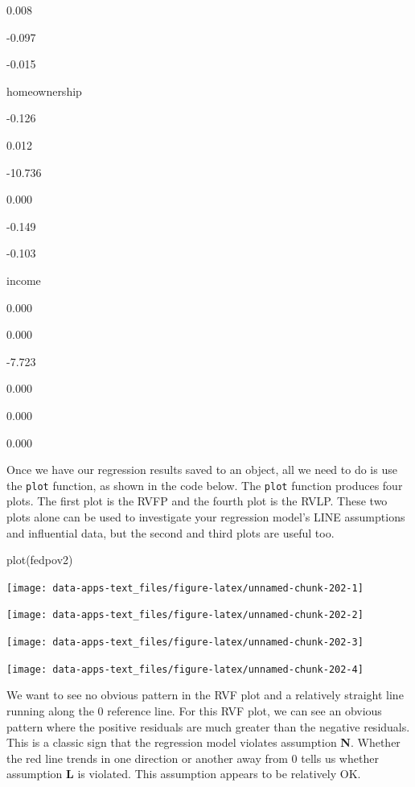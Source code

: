 \documentclass[
]{book}
\makeatletter
\newenvironment{Shaded}{\begin{snugshade}}{\end{snugshade}}
\newcommand{\FunctionTok}[1]{\textcolor[rgb]{0,0,0}{#1}}
\newcommand{\NormalTok}[1]{#1}
\newenvironment{kframe}{%
\medskip{}
\setlength{\fboxsep}{.8em}
 \def\at@end@of@kframe{}%
 \ifinner\ifhmode%
  \def\at@end@of@kframe{\end{minipage}}%
  \begin{minipage}{\columnwidth}%
 \fi\fi%
 \def\FrameCommand##1{\hskip\@totalleftmargin \hskip-\fboxsep
 \colorbox{shadecolor}{##1}\hskip-\fboxsep
     \hskip-\linewidth \hskip-\@totalleftmargin \hskip\columnwidth}%
 \MakeFramed {\advance\hsize-\width
   \@totalleftmargin\z@ \linewidth\hsize
   \@setminipage}}%
 {\par\unskip\endMakeFramed%
 \at@end@of@kframe}
\renewenvironment{Shaded}{\begin{kframe}}{\end{kframe}}
\makeatother
\begin{document}
0.008

-0.097

-0.015

homeownership

-0.126

0.012

-10.736

0.000

-0.149

-0.103

income

0.000

0.000

-7.723

0.000

0.000

0.000

Once we have our regression results saved to an object, all we need to do is use the \texttt{plot} function, as shown in the code below. The \texttt{plot} function produces four plots. The first plot is the RVFP and the fourth plot is the RVLP. These two plots alone can be used to investigate your regression model's LINE assumptions and influential data, but the second and third plots are useful too.

\begin{Shaded}
\begin{Highlighting}[]
\FunctionTok{plot}\NormalTok{(fedpov2)}
\end{Highlighting}
\end{Shaded}

\begin{center}\texttt{[image: data-apps-text\_files/figure-latex/unnamed-chunk-202-1]} \end{center}

\begin{center}\texttt{[image: data-apps-text\_files/figure-latex/unnamed-chunk-202-2]} \end{center}

\begin{center}\texttt{[image: data-apps-text\_files/figure-latex/unnamed-chunk-202-3]} \end{center}

\begin{center}\texttt{[image: data-apps-text\_files/figure-latex/unnamed-chunk-202-4]} \end{center}

We want to see no obvious pattern in the RVF plot and a relatively straight line running along the 0 reference line. For this RVF plot, we can see an obvious pattern where the positive residuals are much greater than the negative residuals. This is a classic sign that the regression model violates assumption \textbf{N}. Whether the red line trends in one direction or another away from 0 tells us whether assumption \textbf{L} is violated. This assumption appears to be relatively OK.
\end{document}
